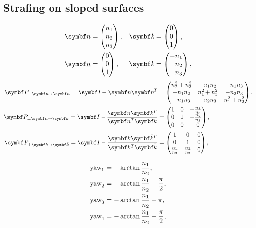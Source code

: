 \subsection{Strafing on sloped surfaces}
\begin{align*}
\vec{n} &=
\begin{pmatrix}
n_1\\n_2\\n_3
\end{pmatrix}, & \vec{k} &=
\begin{pmatrix}
0\\0\\1
\end{pmatrix},\\
\vec{\flat{n}} &=
\begin{pmatrix}
0\\0\\1
\end{pmatrix}, &
\vec{\bar{k}} &=
\begin{pmatrix}
-n_1\\-n_2\\\hphantom{-}n_3
\end{pmatrix},
\end{align*}
%
\begin{align*}
\mat{P}_{\perp \vec{n} \rightarrow \vec{n}} = \mat{I} - \vec{n}\vec{n}^T &=
\begin{pmatrix}
n_2^2+n_3^2 & -n_1 n_2 & -n_1 n_3\\
-n_1 n_2 & n_1^2+n_3^2 & -n_2 n_3\\
-n_1 n_3 & -n_2 n_3 & n_1^2+n_2^2
\end{pmatrix},\\
\mat{P}_{\perp \vec{n} \rightarrow \vec{k}} = \mat{I} - \frac{\vec{n}\vec{k}^T}{\vec{n}^T\vec{k}} &=
\begin{pmatrix}
1 & 0 & -\frac{n_1}{n_3}\\
0 & 1 & -\frac{n_2}{n_3}\\
0 & 0 & \hphantom{-}0
\end{pmatrix},\\
\mat{P}_{\perp \vec{k} \rightarrow \vec{\bar{k}}} = \mat{I} - \frac{\vec{k}\vec{\bar{k}}^T}{\vec{k}^T\vec{\bar{k}}} &=
\begin{pmatrix}
1 & 0 & 0\\
0 & 1 & 0\\
\frac{n_1}{n_3} & \frac{n_2}{n_3} & 0
\end{pmatrix},
\end{align*}

\begin{align*}
\operatorname{yaw}_1 &= -\arctan\frac{n_1}{n_2},\\
\operatorname{yaw}_2 &= -\arctan\frac{n_1}{n_2} + \frac{\pi}{2},\\
\operatorname{yaw}_3 &= -\arctan\frac{n_1}{n_2} + \pi,\\
\operatorname{yaw}_4 &= -\arctan\frac{n_1}{n_2} - \frac{\pi}{2},
\end{align*}

